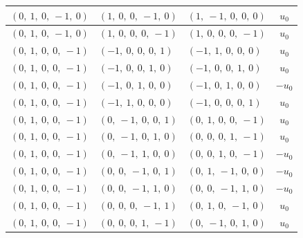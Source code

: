 \documentclass[11pt]{article}
\theoremstyle{definition}
\begin{document}
\begin{longtable}{|l|l|l|c|}
    \hline
    $\left( 0, \  1, \  0, \  -1, \  0\right)$ & $\left( 1, \  0, \  0, \  -1, \  0\right)$ & $\left( 1, \  -1, \  0, \  0, \  0\right)$ & $u_{0}$ \\
    \hline
    $\left( 0, \  1, \  0, \  -1, \  0\right)$ & $\left( 1, \  0, \  0, \  0, \  -1\right)$ & $\left( 1, \  0, \  0, \  0, \  -1\right)$ & $u_{0}$ \\
    \hline
    $\left( 0, \  1, \  0, \  0, \  -1\right)$ & $\left( -1, \  0, \  0, \  0, \  1\right)$ & $\left( -1, \  1, \  0, \  0, \  0\right)$ & $u_{0}$ \\
    \hline
    $\left( 0, \  1, \  0, \  0, \  -1\right)$ & $\left( -1, \  0, \  0, \  1, \  0\right)$ & $\left( -1, \  0, \  0, \  1, \  0\right)$ & $u_{0}$ \\
    \hline
    $\left( 0, \  1, \  0, \  0, \  -1\right)$ & $\left( -1, \  0, \  1, \  0, \  0\right)$ & $\left( -1, \  0, \  1, \  0, \  0\right)$ & $- u_{0}$ \\
    \hline
    $\left( 0, \  1, \  0, \  0, \  -1\right)$ & $\left( -1, \  1, \  0, \  0, \  0\right)$ & $\left( -1, \  0, \  0, \  0, \  1\right)$ & $u_{0}$ \\
    \hline
    $\left( 0, \  1, \  0, \  0, \  -1\right)$ & $\left( 0, \  -1, \  0, \  0, \  1\right)$ & $\left( 0, \  1, \  0, \  0, \  -1\right)$ & $u_{0}$ \\
    \hline
    $\left( 0, \  1, \  0, \  0, \  -1\right)$ & $\left( 0, \  -1, \  0, \  1, \  0\right)$ & $\left( 0, \  0, \  0, \  1, \  -1\right)$ & $u_{0}$ \\
    \hline
    $\left( 0, \  1, \  0, \  0, \  -1\right)$ & $\left( 0, \  -1, \  1, \  0, \  0\right)$ & $\left( 0, \  0, \  1, \  0, \  -1\right)$ & $- u_{0}$ \\
    \hline
    $\left( 0, \  1, \  0, \  0, \  -1\right)$ & $\left( 0, \  0, \  -1, \  0, \  1\right)$ & $\left( 0, \  1, \  -1, \  0, \  0\right)$ & $- u_{0}$ \\
    \hline
    $\left( 0, \  1, \  0, \  0, \  -1\right)$ & $\left( 0, \  0, \  -1, \  1, \  0\right)$ & $\left( 0, \  0, \  -1, \  1, \  0\right)$ & $- u_{0}$ \\
    \hline
    $\left( 0, \  1, \  0, \  0, \  -1\right)$ & $\left( 0, \  0, \  0, \  -1, \  1\right)$ & $\left( 0, \  1, \  0, \  -1, \  0\right)$ & $u_{0}$ \\
    \hline
    $\left( 0, \  1, \  0, \  0, \  -1\right)$ & $\left( 0, \  0, \  0, \  1, \  -1\right)$ & $\left( 0, \  -1, \  0, \  1, \  0\right)$ & $u_{0}$ \\

\end{longtable}
\end{document}
